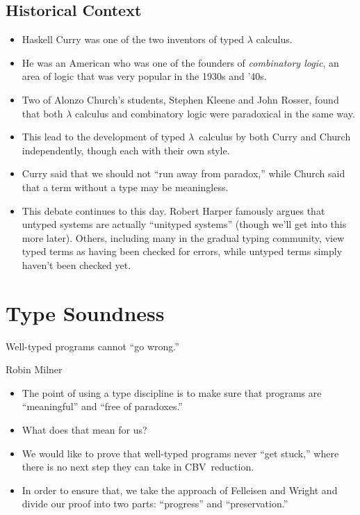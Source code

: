 \documentclass{lecturenotes}
\begin{document}
\subsection{Historical Context}
\label{sec:historical-context}

\begin{itemize}
\item Haskell Curry was one of the two inventors of typed $\lambda$ calculus.
\item He was an American who was one of the founders of \emph{combinatory logic}, an area of logic that was very popular in the 1930s and '40s.
\item Two of Alonzo Church's students, Stephen Kleene and John Rosser, found that both $\lambda$ calculus and combinatory logic were paradoxical in the same way.
\item This lead to the development of typed $\lambda$~calculus by both Curry and Church independently, though each with their own style.
\item Curry said that we should not ``run away from paradox,'' while Church said that a term without a type may be meaningless.
\item This debate continues to this day.
  Robert Harper famously argues that untyped systems are actually ``unityped systems'' (though we'll get into this more later).
  Others, including many in the gradual typing community, view typed terms as having been checked for errors, while untyped terms simply haven't been checked yet.
\end{itemize}

\section{Type Soundness}
\label{sec:type-soundness}

\epigraph{Well-typed programs cannot ``go wrong.''}{Robin Milner}

\begin{itemize}
\item The point of using a type discipline is to make sure that programs are ``meaningful'' and ``free of paradoxes.''
\item What does that mean for us?
\item We would like to prove that well-typed programs never ``get stuck,'' where there is no next step they can take in CBV~reduction.
\item In order to ensure that, we take the approach of Felleisen and Wright and divide our proof into two parts: ``progress'' and ``preservation.''
\end{itemize}
\end{document}
